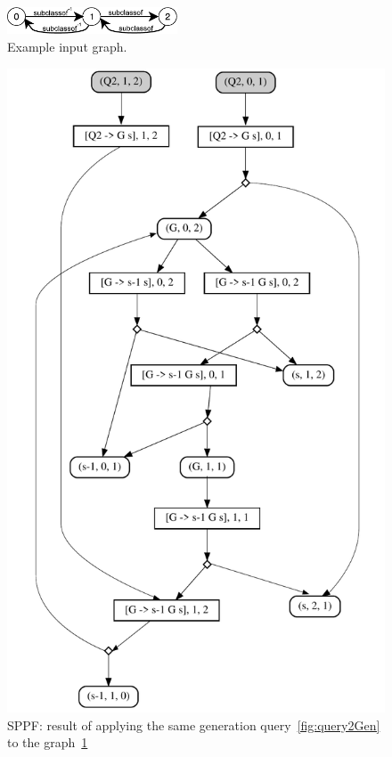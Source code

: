 \begin{figure}[h]
\includegraphics[width=0.45\textwidth]{graph}
\caption{Example input graph.}
\label{fig:graph}
\end{figure}

\begin{figure}[h]
\includegraphics[scale=0.5]{sppf}
\caption{SPPF: result of applying the same generation query~\ref{fig:query2Gen} to the graph~\ref{fig:graph}}
\label{fig:sppf}
\end{figure}
